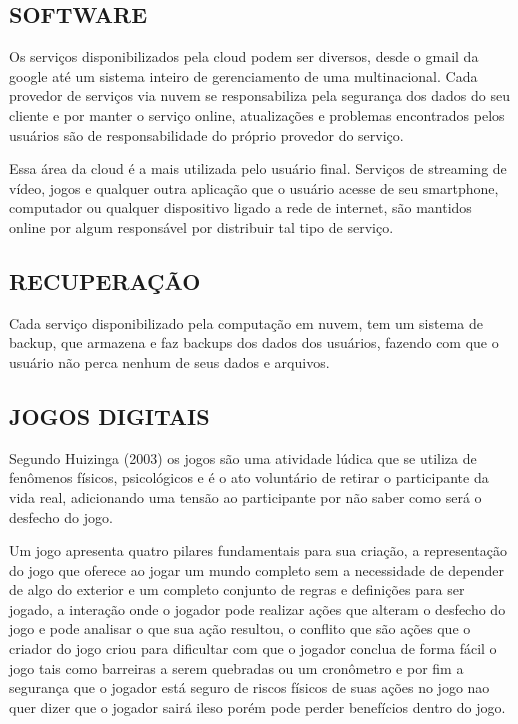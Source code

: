 \begin{justify}
    \subsection{SOFTWARE}
    Os serviços disponibilizados pela cloud podem ser diversos, desde o gmail da google até
    um sistema inteiro de gerenciamento de uma multinacional. Cada provedor de serviços via
    nuvem se responsabiliza pela segurança dos dados do seu cliente e por manter o serviço
    online, atualizações e problemas encontrados pelos usuários são de responsabilidade do
    próprio provedor do serviço. \cite{taurion2009cloud}

    Essa área da cloud é a mais utilizada pelo usuário final. Serviços de streaming de vídeo,
    jogos e qualquer outra aplicação que o usuário acesse de seu smartphone, computador ou
    qualquer dispositivo ligado a rede de internet, são mantidos online por algum responsável
    por distribuir tal tipo de serviço.

    \subsection{RECUPERAÇÃO}
    Cada serviço disponibilizado pela computação em nuvem, tem um sistema de backup, que
    armazena e faz backups dos dados dos usuários, fazendo com que o usuário não perca
    nenhum de seus dados e arquivos. \cite{rashid2019cloud}

    \subsection{JOGOS DIGITAIS}
    Segundo Huizinga (2003) os jogos são uma atividade lúdica que se utiliza de fenômenos
    físicos, psicológicos e é o ato voluntário de retirar o participante da vida real, adicionando
    uma tensão ao participante por não saber como será o desfecho do jogo.

    Um jogo apresenta quatro pilares fundamentais para sua criação, a representação do jogo
    que oferece ao jogar um mundo completo sem a necessidade de depender de algo do
    exterior e um completo conjunto de regras e definições para ser jogado, a interação onde o
    jogador pode realizar ações que alteram o desfecho do jogo e pode analisar o que sua ação
    resultou, o conflito que são ações que o criador do jogo criou para dificultar com que o
    jogador conclua de forma fácil o jogo tais como barreiras a serem quebradas ou um
    cronômetro e por fim a segurança que o jogador está seguro de riscos físicos de suas ações
    no jogo nao quer dizer que o jogador sairá ileso porém pode perder benefícios dentro do
    jogo. \cite{crawford1984art}



\end{justify}